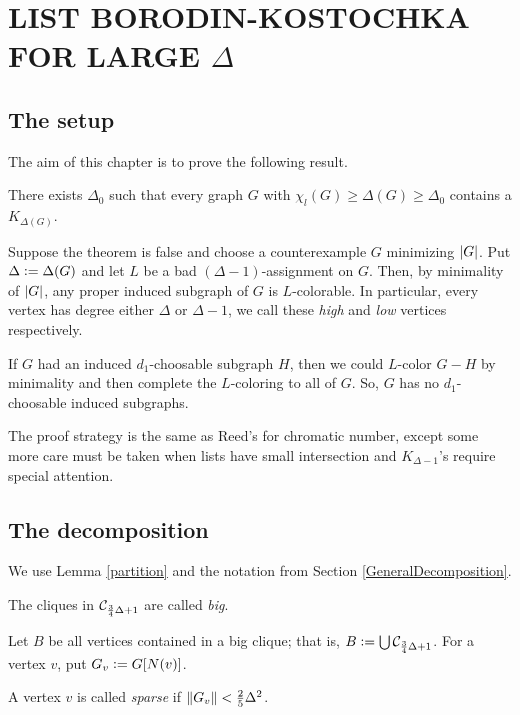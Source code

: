 \chapter{\texorpdfstring{LIST BORODIN-KOSTOCHKA FOR LARGE $\Delta$}{LIST BORODIN-KOSTOCHKA FOR LARGE MAXIMUM DEGREE}}\label{ChoiceLargeDeltaChapter}
\section{The setup}
\noindent The aim of this chapter is to prove the following result.

\begin{thm}
There exists $\Delta_0$ such that every graph $G$ with $\chi_l(G) \geq \Delta(G)
\geq \Delta_0$ contains a $K_{\Delta(G)}$.
\end{thm}

Suppose the theorem is false and choose a counterexample $G$ minimizing
$\left|G\right|$.  Put $\Delta \mathrel{\mathop:}= \Delta(G)$ and let $L$ be a bad
$(\Delta - 1)$-assignment on $G$.  Then, by minimality of $\left|G\right|$, any proper
induced subgraph of $G$ is $L$-colorable.  In particular, every vertex has
degree either $\Delta$ or $\Delta-1$, we call these \emph{high} and \emph{low}
vertices respectively. 

If $G$ had an induced $d_1$-choosable subgraph $H$, then we could
$L$-color $G - H$ by minimality and then complete the $L$-coloring to all of
$G$.  So, $G$ has no $d_1$-choosable induced subgraphs.  

The proof strategy is the same as Reed's \cite{reed1999strengthening} for
chromatic number, except some more care must be taken when lists have small
intersection and $K_{\Delta-1}$'s require special attention.

\section{The decomposition}
We use Lemma \ref{partition} and the notation from Section
\ref{GeneralDecomposition}.

\begin{defn}
The cliques in $\mathcal{C}_{\frac34 \Delta + 1}$ are called \emph{big}.
\end{defn}

Let $B$ be all vertices contained in a big clique; that is, $B \mathrel{\mathop:}=
\bigcup \mathcal{C}_{\frac34 \Delta + 1}$. For a vertex $v$, put $G_v \mathrel{\mathop:}= G[N(v)]$.

\begin{defn}
A vertex $v$ is called \emph{sparse} if $\left\Vert G_v\right\Vert < \frac25 \Delta^2$.
\end{defn}

